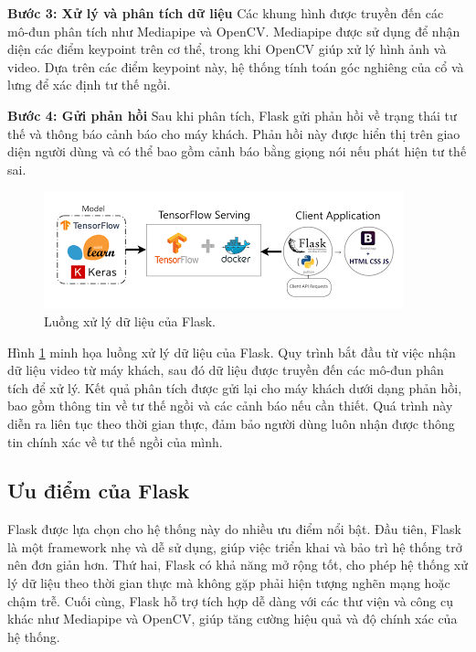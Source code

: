 \documentclass[conference]{IEEEtran}
\begin{document}
\textbf{Bước 3: Xử lý và phân tích dữ liệu}  
    Các khung hình được truyền đến các mô-đun phân tích như Mediapipe và OpenCV. Mediapipe được sử dụng để nhận diện các điểm keypoint trên cơ thể, trong khi OpenCV giúp xử lý hình ảnh và video. Dựa trên các điểm keypoint này, hệ thống tính toán góc nghiêng của cổ và lưng để xác định tư thế ngồi.
    
 \textbf{Bước 4: Gửi phản hồi}  
    Sau khi phân tích, Flask gửi phản hồi về trạng thái tư thế và thông báo cảnh báo cho máy khách. Phản hồi này được hiển thị trên giao diện người dùng và có thể bao gồm cảnh báo bằng giọng nói nếu phát hiện tư thế sai.

\begin{figure}[H]
    \centering
    \includegraphics[width=0.9\linewidth]{images/flask_workflow.png}
    \caption{Luồng xử lý dữ liệu của Flask.}
    \label{fig:flask_workflow}
\end{figure}

Hình \ref{fig:flask_workflow} minh họa luồng xử lý dữ liệu của Flask. Quy trình bắt đầu từ việc nhận dữ liệu video từ máy khách, sau đó dữ liệu được truyền đến các mô-đun phân tích để xử lý. Kết quả phân tích được gửi lại cho máy khách dưới dạng phản hồi, bao gồm thông tin về tư thế ngồi và các cảnh báo nếu cần thiết. Quá trình này diễn ra liên tục theo thời gian thực, đảm bảo người dùng luôn nhận được thông tin chính xác về tư thế ngồi của mình.

\subsection{Ưu điểm của Flask}
Flask được lựa chọn cho hệ thống này do nhiều ưu điểm nổi bật. Đầu tiên, Flask là một framework nhẹ và dễ sử dụng, giúp việc triển khai và bảo trì hệ thống trở nên đơn giản hơn. Thứ hai, Flask có khả năng mở rộng tốt, cho phép hệ thống xử lý dữ liệu theo thời gian thực mà không gặp phải hiện tượng nghẽn mạng hoặc chậm trễ. Cuối cùng, Flask hỗ trợ tích hợp dễ dàng với các thư viện và công cụ khác như Mediapipe và OpenCV, giúp tăng cường hiệu quả và độ chính xác của hệ thống.
\end{document}
